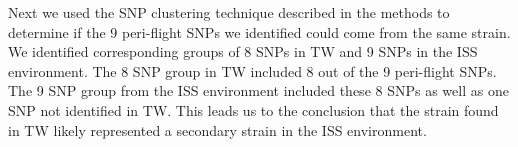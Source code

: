 Next we used the SNP clustering technique described in the methods to determine if the 9 peri-flight SNPs we identified could come from the same strain. We identified corresponding groups of 8 SNPs in TW and 9 SNPs in the ISS environment. The 8 SNP group in TW included 8 out of the 9 peri-flight SNPs. The 9 SNP group from the ISS environment included these 8 SNPs as well as one SNP not identified in TW. This leads us to the conclusion that the strain found in TW likely represented a secondary strain in the ISS environment. 

